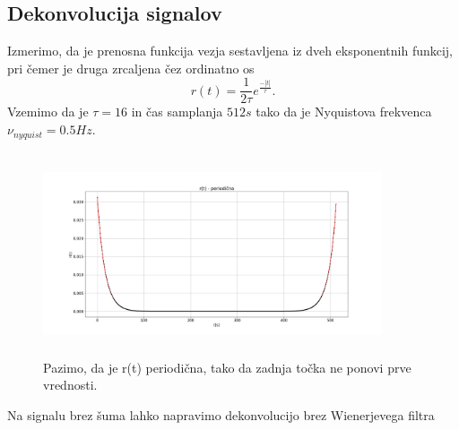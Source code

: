 \documentclass[11pt, a4paper]{article}
\begin{document}
\subsection{Dekonvolucija signalov}
Izmerimo, da je prenosna funkcija vezja sestavljena iz dveh eksponentnih funkcij, pri čemer je druga zrcaljena čez ordinatno os 
\begin{equation}
r(t)=\frac{1}{2 \tau} e^{\frac{-|t|}{\tau}}.
\end{equation}
Vzemimo da je $\tau = 16$ in čas samplanja $512s$ tako da je Nyquistova frekvenca $\nu_{nyquist} = 0.5 Hz$.
\begin{figure}[H]
\centering
\includegraphics[width=10cm, height=6cm]{druga_drugi1.png}
\caption{Pazimo, da je r(t) periodična, tako da zadnja točka ne ponovi prve vrednosti.}  
\end{figure}
Na signalu brez šuma lahko napravimo dekonvolucijo brez Wienerjevega filtra
\end{document}
